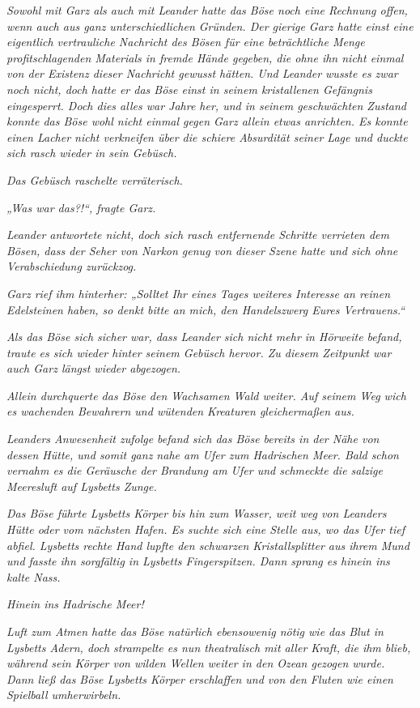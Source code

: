 \textit{Sowohl mit Garz als auch mit Leander hatte das Böse noch eine Rechnung offen, wenn auch aus ganz unterschiedlichen Gründen. Der gierige Garz hatte einst eine eigentlich vertrauliche Nachricht des Bösen für eine beträchtliche Menge profitschlagenden Materials in fremde Hände gegeben, die ohne ihn nicht einmal von der Existenz dieser Nachricht gewusst hätten. Und Leander wusste es zwar noch nicht, doch hatte er das Böse einst in seinem kristallenen Gefängnis eingesperrt. Doch dies alles war Jahre her, und in seinem geschwächten Zustand konnte das Böse wohl nicht einmal gegen Garz allein etwas anrichten. Es konnte einen Lacher nicht verkneifen über die schiere Absurdität seiner Lage und duckte sich rasch wieder in sein Gebüsch.}

\textit{Das Gebüsch raschelte verräterisch.}

\textit{„Was war das?!“, fragte Garz.}

\textit{Leander antwortete nicht, doch sich rasch entfernende Schritte verrieten dem Bösen, dass der Seher von Narkon genug von dieser Szene hatte und sich ohne Verabschiedung zurückzog.}

\textit{Garz rief ihm hinterher: „Solltet Ihr eines Tages weiteres Interesse an reinen Edelsteinen haben, so denkt bitte an mich, den Handelszwerg Eures Vertrauens.“}

\textit{Als das Böse sich sicher war, dass Leander sich nicht mehr in Hörweite befand, traute es sich wieder hinter seinem Gebüsch hervor. Zu diesem Zeitpunkt war auch Garz längst wieder abgezogen.}

\textit{Allein durchquerte das Böse den Wachsamen Wald weiter. Auf seinem Weg wich es wachenden Bewahrern und wütenden Kreaturen gleichermaßen aus.}

\textit{Leanders Anwesenheit zufolge befand sich das Böse bereits in der Nähe von dessen Hütte, und somit ganz nahe am Ufer zum Hadrischen Meer. Bald schon vernahm es die Geräusche der Brandung am Ufer und schmeckte die salzige Meeresluft auf Lysbetts Zunge.}

\textit{Das Böse führte Lysbetts Körper bis hin zum Wasser, weit weg von Leanders Hütte oder vom nächsten Hafen. Es suchte sich eine Stelle aus, wo das Ufer tief abfiel. Lysbetts rechte Hand lupfte den schwarzen Kristallsplitter aus ihrem Mund und fasste ihn sorgfältig in Lysbetts Fingerspitzen. Dann sprang es hinein ins kalte Nass.}

\textit{Hinein ins Hadrische Meer!}

\textit{Luft zum Atmen hatte das Böse natürlich ebensowenig nötig wie das Blut in Lysbetts Adern, doch strampelte es nun theatralisch mit aller Kraft, die ihm blieb, während sein Körper von wilden Wellen weiter in den Ozean gezogen wurde. Dann ließ das Böse Lysbetts Körper erschlaffen und von den Fluten wie einen Spielball umherwirbeln.}


